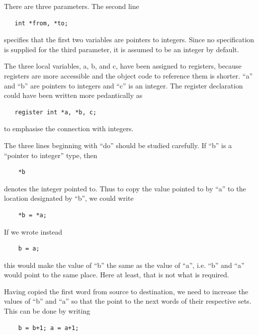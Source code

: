 There are three parameters. The second
line

\begin{verbatim}
   int *from, *to;
\end{verbatim}

\noindent specifies that the first two variables
are pointers to integers. Since no
specification is supplied for the third
parameter, it is assumed to be an
integer by default.

The three local variables, a, b, and c,
have been assigned to registers,
because registers are more accessible
and the object code to reference them
is shorter. ``a'' and ``b'' are pointers to
integers and ``c'' is an integer. The
register declaration could have been
written more pedantically as

\begin{verbatim}
   register int *a, *b, c;
\end{verbatim}

\noindent to emphasise the connection with
integers.

The three lines beginning with ``do''
should be studied carefully. If ``b'' is
a ``pointer to integer'' type, then

\begin{verbatim}
    *b
\end{verbatim}

\noindent denotes the integer pointed to. Thus to
copy the value pointed to by ``a'' to the
location designated by ``b'', we could
write

\begin{verbatim}
    *b = *a;
\end{verbatim}

\noindent If we wrote instead

\begin{verbatim}
    b = a;
\end{verbatim}

this would make the value of ``b'' the
same as the value of ``a'', i.e. ``b'' and
``a'' would point to the same place.
Here at least, that is not what is
required.

Having copied the first word from
source to destination, we need to
increase the values of ``b'' and ``a'' so
that the point to the next words of
their respective sets. This can be done
by writing

\begin{verbatim}
    b = b+1; a = a+1;
\end{verbatim}

